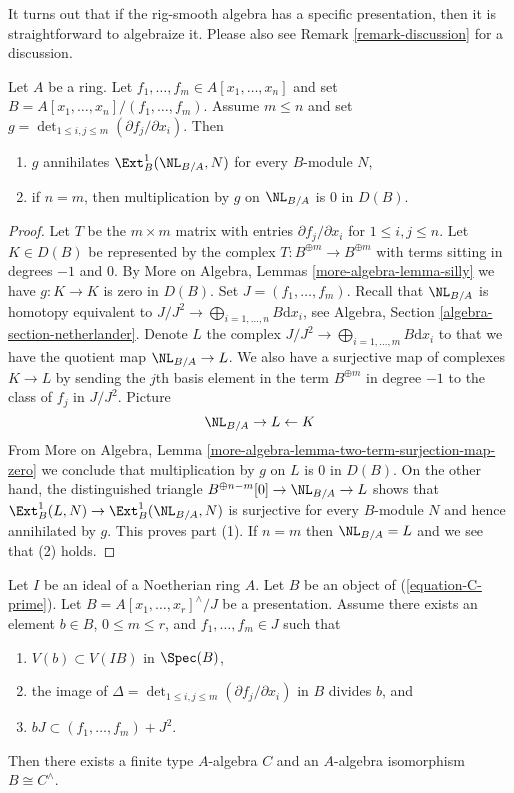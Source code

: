 \noindent
It turns out that if the rig-smooth algebra has a specific presentation,
then it is straightforward to algebraize it. Please also see
Remark \ref{remark-discussion} for a discussion.

\begin{lemma}
\label{lemma-presentation-rig-smooth}
Let $A$ be a ring. Let $f_1, \ldots, f_m \in A[x_1, \ldots, x_n]$
and set $B = A[x_1, \ldots, x_n]/(f_1, \ldots, f_m)$. Assume $m \leq n$
and set $g = \det_{1 \leq i, j \leq m}(\partial f_j/\partial x_i)$.
Then
\begin{enumerate}
\item $g$ annihilates $\Ext^1_B(\NL_{B/A}, N)$ for every $B$-module $N$,
\item if $n = m$, then multiplication by $g$ on $\NL_{B/A}$ is $0$ in $D(B)$.
\end{enumerate}
\end{lemma}

\begin{proof}
Let $T$ be the $m \times m$ matrix with entries $\partial f_j/\partial x_i$
for $1 \leq i, j \leq n$. Let $K \in D(B)$ be represented by the complex
$T : B^{\oplus m} \to B^{\oplus m}$ with terms sitting in degrees $-1$ and $0$.
By More on Algebra, Lemmas \ref{more-algebra-lemma-silly}
we have $g : K \to K$ is zero in $D(B)$. Set $J = (f_1, \ldots, f_m)$.
Recall that $\NL_{B/A}$ is homotopy equivalent to
$J/J^2 \to \bigoplus_{i = 1, \ldots, n} B\text{d}x_i$, see
Algebra, Section \ref{algebra-section-netherlander}.
Denote $L$ the complex $J/J^2 \to \bigoplus_{i = 1, \ldots, m} B\text{d}x_i$
to that we have the quotient map $\NL_{B/A} \to L$.
We also have a surjective map of complexes $K \to L$
by sending the $j$th basis element in the term $B^{\oplus m}$
in degree $-1$ to the class of $f_j$ in $J/J^2$. Picture
$$
\NL_{B/A} \to L \leftarrow K
$$
From
More on Algebra, Lemma \ref{more-algebra-lemma-two-term-surjection-map-zero}
we conclude that multiplication by $g$ on $L$ is $0$ in $D(B)$.
On the other hand, the distinguished triangle
$B^{\oplus n - m}[0] \to \NL_{B/A} \to L$
shows that $\Ext^1_B(L, N) \to \Ext^1_B(\NL_{B/A}, N)$ is surjective
for every $B$-module $N$ and hence annihilated by $g$.
This proves part (1).
If $n = m$ then $\NL_{B/A} = L$ and we see that (2) holds.
\end{proof}

\begin{lemma}
\label{lemma-approximate-presentation-rig-smooth}
Let $I$ be an ideal of a Noetherian ring $A$. Let $B$ be an object
of (\ref{equation-C-prime}). Let $B = A[x_1, \ldots, x_r]^\wedge/J$
be a presentation. Assume there exists an element
$b \in B$, $0 \leq m \leq r$, and $f_1, \ldots, f_m \in J$
such that
\begin{enumerate}
\item $V(b) \subset V(IB)$ in $\Spec(B)$,
\item the image of
$\Delta = \det_{1 \leq i, j \leq m}(\partial f_j/\partial x_i)$
in $B$ divides $b$, and
\item $b J \subset (f_1, \ldots, f_m) + J^2$.
\end{enumerate}
Then there exists a finite type $A$-algebra $C$ and an $A$-algebra
isomorphism $B \cong C^\wedge$.
\end{lemma}

